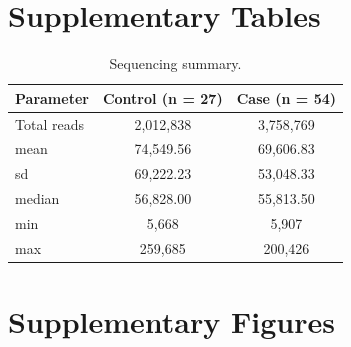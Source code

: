 \documentclass[biotech,article,submit,pdftex,moreauthors]{Definitions/mdpi}
\begin{document}



\appendixstart
\appendix
\section[\appendixname~\thesection]{Supplementary Tables}

\begin{table}[H] 
	\caption{Sequencing summary. \label{stab:seq_sum}}
	\centering
	\begin{tabular}{l|cc}
		\toprule
		\textbf{Parameter} & \textbf{Control (n = 27)} & \textbf{Case (n = 54)} \\
		\midrule
		Total reads       & 2,012,838  & 3,758,769  \\
		mean              & 74,549.56  & 69,606.83  \\
		sd                & 69,222.23  & 53,048.33  \\
		median            & 56,828.00  & 55,813.50  \\
		min               & 5,668      & 5,907      \\
		max               & 259,685    & 200,426    \\
		\bottomrule
	\end{tabular}
\end{table}
	

\section[\appendixname~\thesection]{Supplementary Figures}
\end{document}

